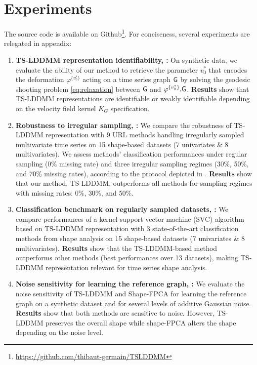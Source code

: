 \section{Experiments}
\vspace{-1ex}
\label{section:experiments}
The source code is available on Github\footnote{\url{https://github.com/thibaut-germain/TSLDDMM}}. For conciseness, several experiments are relegated in appendix: 

\begin{enumerate}
    \item \textbf{TS-LDDMM representation identifiability, :} On synthetic data, we evaluate the ability of our method to retrieve the parameter $v_0^*$ that encodes the deformation $\varphi^{\{v_0^*\}}$ acting on a time series graph $\mathsf{G}$ by solving the geodesic shooting problem \eqref{eq:relaxation} between $\mathsf{G}$ and $\varphi^{\{v_0^*\}}.\mathsf{G}$. \textbf{Results} show that TS-LDDMM representations are identifiable or weakly identifiable depending on the velocity field kernel $K_G$ specification.
  
    \item \textbf{Robustness to irregular sampling, :} We compare the robustness of TS-LDDMM representation with 9 URL methods handling irregularly sampled multivariate time series on 15 shape-based datasets (7 univariates \& 8 multivariates).
    We assess methods' classification performances under regular sampling (0\% missing rate) and three irregular sampling regimes (30\%, 50\%, and 70\% missing rates), according to the protocol depicted in \cite{kidger2020neural}. \textbf{Results} show that our method, TS-LDDMM, outperforms all methods for sampling regimes with missing rates: 0\%, 30\%, and 50\%.
    
    \item \textbf{Classification benchmark on regularly sampled datasets, :} We compare performances of a kernel support vector machine (SVC) algorithm based on TS-LDDMM representation with 3 state-of-the-art classification methods from shape analysis on 15 shape-based datasets (7 univariates \& 8 multivariates). \textbf{Results} show that the TS-LDDMM-based method outperforms other methods (best performances over 13 datasets), making TS-LDDMM representation relevant for time series shape analysis.
    
    \item \textbf{Noise sensitivity for learning the reference graph, :} We evaluate the noise sensitivity of TS-LDDMM and Shape-FPCA \cite{wu2024shape} for learning the reference graph on a synthetic dataset and for several levels of additive Gaussian noise. \textbf{Results} show that both methods are sensitive to noise. However, TS-LDDMM preserves the overall shape while shape-FPCA alters the shape depending on the noise level. 
\end{enumerate}


